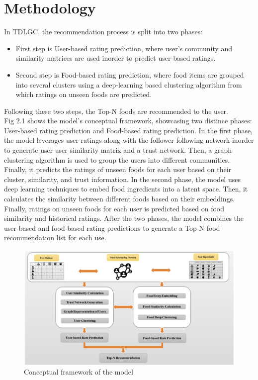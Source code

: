 \chapter{Methodology}\label{chapter:Methodology}


In TDLGC, the recommendation process is split into two phases:
\begin{itemize}
    \item First step is User-based rating prediction, where user's community and similarity matrices are used inorder to predict user-based ratings\cite*{9775081}.
    \item Second step is Food-based rating prediction, where food items are grouped into several clusters using a deep-learning based clustering algorithm\cite*{9775081, oulu_tdlgc} from which ratings on unseen foods are predicted.
\end{itemize}
Following these two steps, the Top-N foods are recommended\cite*{9775081} to the user.
\\
Fig 2.1\cite*{9775081, oulu_tdlgc} shows the model's conceptual framework, showcasing two distince phases: User-based rating prediction and Food-based rating prediction\cite*{9775081}. In the first phase, the model leverages user ratings along with the follower-following network inorder to generate user-user similarity matrix\cite*{9775081, oulu_tdlgc} and a trust network. Then, a graph clustering algorithm\cite*{ZHAO2021358} is used to group the users into different communities. Finally, it predicts the ratings of unseen foods for each user based on their cluster, similarity, and trust information. In the second phase, the model uses deep learning techniques to embed food ingredients into a latent space. Then, it calculates the similarity between different foods based on their embeddings. Finally, ratings on unseen foods for each user is predicted based on food similarity and historical ratings. After the two phases, the model combines the user-based and food-based rating predictions to generate a Top-N food recommendation list for each use.

\begin{figure}[htp]
    \centering
    \includegraphics[width=12cm]{fig1_model_conceptual_framework.jpg}
    \caption{Conceptual framework of the model}
    \label{fig:framework}
\end{figure}

